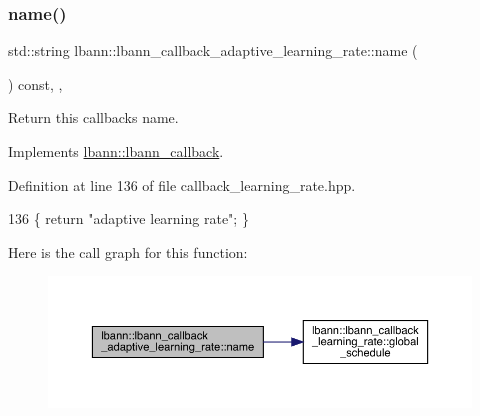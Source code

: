 \subsubsection{\texorpdfstring{name()}{name()}}
{\footnotesize\ttfamily std\+::string lbann\+::lbann\+\_\+callback\+\_\+adaptive\+\_\+learning\+\_\+rate\+::name (\begin{DoxyParamCaption}{ }\end{DoxyParamCaption}) const\hspace{0.3cm}{\ttfamily [inline]}, {\ttfamily [override]}, {\ttfamily [virtual]}}

Return this callback\textquotesingle{}s name. 

Implements \hyperlink{classlbann_1_1lbann__callback_a7522c7a14f1d6a1ea762cc2d7248eb3a}{lbann\+::lbann\+\_\+callback}.



Definition at line 136 of file callback\+\_\+learning\+\_\+rate.\+hpp.


\begin{DoxyCode}
136 \{ \textcolor{keywordflow}{return} \textcolor{stringliteral}{"adaptive learning rate"}; \}
\end{DoxyCode}
Here is the call graph for this function\+:\nopagebreak
\begin{figure}[H]
\begin{center}
\leavevmode
\includegraphics[width=350pt]{classlbann_1_1lbann__callback__adaptive__learning__rate_ab7292639822b95f3907d1aaf88410b1c_cgraph}
\end{center}
\end{figure}
\mbox{\label{classlbann_1_1lbann__callback__adaptive__learning__rate_a7959faa8ba665cdf1132a5c7b518b3b9}} 
